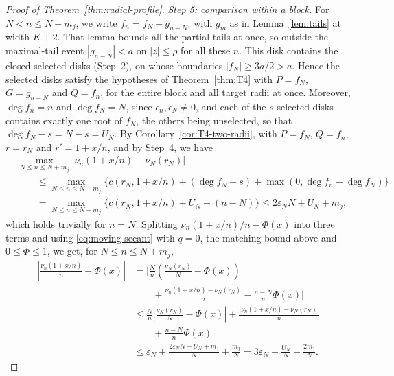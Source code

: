 \begin{proof}[Proof of Theorem~\ref{thm:radial-profile}]
\emph{Step 5: comparison within a block.}
For $N<n\le N+m_j$, we write $f_n=f_N+g_{n-N}$, with $g_m$ as in
Lemma~\ref{lem:tails} at width $K+2$. That lemma bounds all the partial
tails at once, so outside the maximal-tail event $|g_{n-N}|<a$ on
$|z|\le\rho$ for all these $n$. This disk contains the closed selected
disks (Step~2), on whose boundaries $|f_N|\ge3a/2>a$. Hence the selected
disks satisfy the hypotheses of Theorem~\ref{thm:T4} with $P=f_N$,
$G=g_{n-N}$ and $Q=f_n$, for the entire block and all target radii at
once. Moreover, $\deg f_n=n$ and $\deg f_N=N$, since
$\epsilon_n,\epsilon_N\ne0$, and each of the $s$ selected disks contains
exactly one root of $f_N$, the others being unselected, so that
$\deg f_N-s=N-s=U_N$.
By Corollary~\ref{cor:T4-two-radii}, with $P=f_N$, $Q=f_n$, $r=r_N$ and
$r'=1+x/n$, and by Step~4, we have
\begin{align*}
 &\max_{N\le n\le N+m_j}|\nu_n(1+x/n)-\nu_N(r_N)|\\
 &\qquad\le\max_{N\le n\le N+m_j}\bigl\{c(r_N,1+x/n)+(\deg f_N-s)
   +\max(0,\deg f_n-\deg f_N)\bigr\}\\
 &\qquad=\max_{N\le n\le N+m_j}\bigl\{c(r_N,1+x/n)+U_N+(n-N)\bigr\}
 \le2\varepsilon_NN+U_N+m_j,
\end{align*}
which holds trivially for $n=N$.
Splitting $\nu_n(1+x/n)/n-\Phi(x)$ into three terms and using
\eqref{eq:moving-secant} with $q=0$, the matching bound above and
$0\le\Phi\le1$, we get, for $N\le n\le N+m_j$,
\begin{align}
 \left|\frac{\nu_n(1+x/n)}n-\Phi(x)\right|
 &=\biggl|\frac Nn\left(\frac{\nu_N(r_N)}N-\Phi(x)\right)\nonumber\\
 &\qquad+\frac{\nu_n(1+x/n)-\nu_N(r_N)}n-\frac{n-N}n\Phi(x)\biggr|\nonumber\\
 &\le \frac Nn\left|\frac{\nu_N(r_N)}N-\Phi(x)\right|
 +\frac{|\nu_n(1+x/n)-\nu_N(r_N)|}{n}\nonumber\\
 &\qquad+\frac{n-N}{n}\Phi(x)\nonumber\\
 &\le\varepsilon_N+\frac{2\varepsilon_NN+U_N+m_j}N+\frac{m_j}N
 =3\varepsilon_N+\frac{U_N}N+\frac{2m_j}N.
 \label{eq:unit-block}
\end{align}


\end{proof}
